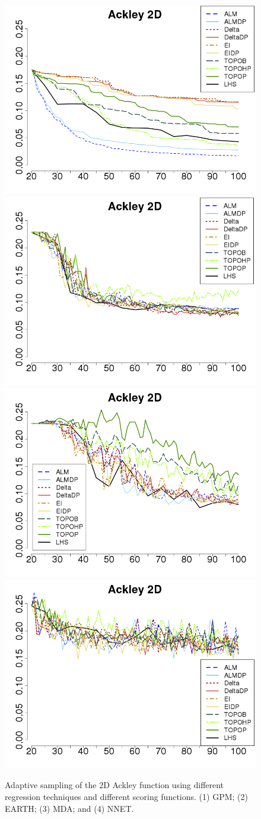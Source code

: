 \begin{figure}[!ht]
\begin{center}
\includegraphics[width=0.2425\linewidth]{figs/chap5/gpm_Ackley_td=20}
\includegraphics[width=0.2425\linewidth]{figs/chap5/earth_Ackley_td=20}
\includegraphics[width=0.2425\linewidth]{figs/chap5/mda_Ackley_td=20}
\includegraphics[width=0.2425\linewidth]{figs/chap5/nnet_Ackley_td=20}
\caption{Adaptive sampling of the 2D Ackley function using different regression techniques and different scoring functions.
%
(1) GPM; (2) EARTH; (3) MDA; and (4) NNET.}
\label{fig:ackley2D_results}
\end{center}
\end{figure}

